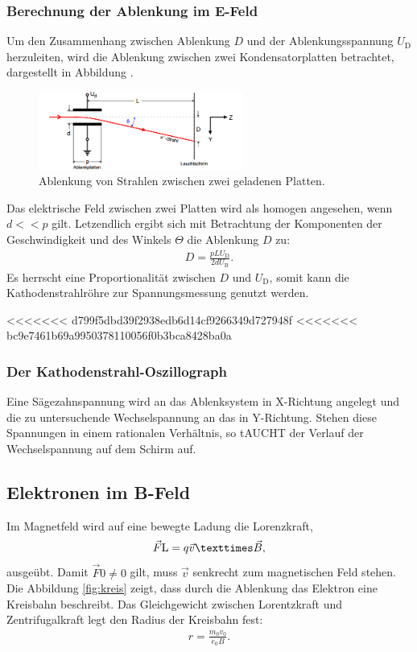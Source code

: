 \subsubsection{Berechnung der Ablenkung im E-Feld}
Um den Zusammenhang zwischen Ablenkung $D$ und der Ablenkungsspannung
$U_\mathrm{D}$ herzuleiten, wird die Ablenkung zwischen zwei
Kondensatorplatten betrachtet, dargestellt in Abbildung \label{fig:platte}.
\begin{figure}
 \centering
 \includegraphics[width=0.6\textwidth]{kondensator.png}
 \caption{Ablenkung von Strahlen zwischen zwei geladenen Platten.}
 \label{fig:kondensator}
\end{figure}
Das elektrische Feld zwischen zwei Platten wird als homogen angesehen, wenn
$d<<p$ gilt.
Letzendlich ergibt sich mit Betrachtung der Komponenten der Geschwindigkeit
und des Winkels $\Theta$ die Ablenkung $D$ zu:
\begin{align}
 D=\frac{pLU_\mathrm{D}}{2dU_\mathrm{B}}.
\end{align}
Es herrscht eine Proportionalität zwischen $D$ und $U_\mathrm{D}$,
somit kann die Kathodenstrahlröhre zur Spannungsmessung genutzt werden.

<<<<<<< d799f5dbd39f2938edb6d14cf9266349d727948f
<<<<<<< bc9e7461b69a9950378110056f0b3bca8428ba0a
\subsubsection{Der Kathodenstrahl-Oszillograph}
Eine Sägezahnspannung wird an das Ablenksystem in X-Richtung angelegt und die zu untersuchende Wechselspannung an das in Y-Richtung.
Stehen diese Spannungen in einem rationalen Verhältnis, so tAUCHT der Verlauf der Wechselspannung auf dem Schirm auf.



\subsection{Elektronen im B-Feld}
Im Magnetfeld wird auf eine bewegte Ladung die Lorenzkraft,
\begin{align}
\vec{F}\mathrm{L}=q\vec{v}\texttimes\vec{B},
\end{align}
ausgeübt. Damit $\vec{F}\mathrm{0} \neq 0 $ gilt, muss $\vec{v}$ senkrecht zum magnetischen Feld stehen.
Die Abbildung \ref{fig:kreis} zeigt, dass durch die Ablenkung das Elektron eine Kreisbahn beschreibt. Das Gleichgewicht zwischen Lorentzkraft und Zentrifugalkraft legt den
Radius der Kreisbahn fest:
\begin{align}
  r=\frac{m_\mathrm{0}v_\mathrm{0}}{e_\mathrm{0}B}\label{eqn:radius}.
\end{align}

